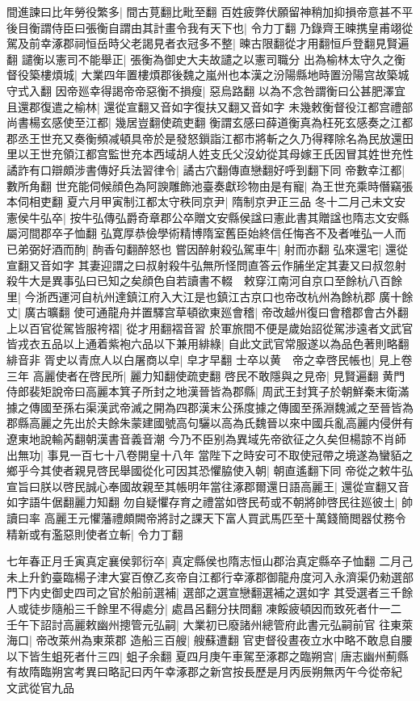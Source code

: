 間進諫曰比年勞役繁多|{
	間古莧翻比毗至翻}
百姓疲弊伏願留神稍加抑損帝意甚不平後目衡謂侍臣曰張衡自謂由其計畫令我有天下也|{
	令力丁翻}
乃錄齊王暕携皇甫翊從駕及前幸涿郡祠恒岳時父老謁見者衣冠多不整|{
	暕古限翻從才用翻恒戶登翻見賢遍翻}
譴衡以憲司不能舉正|{
	張衡為御史大夫故譴之以憲司職分}
出為榆林太守久之衡督役築樓煩城|{
	大業四年置樓煩郡後魏之嵐州也本漢之汾陽縣地時置汾陽宫故築城守式入翻}
因帝廵幸得謁帝帝惡衡不損瘦|{
	惡烏路翻}
以為不念咎謂衡曰公甚肥澤宜且還郡復遣之榆林|{
	還從宣翻又音如字復扶又翻又音如字}
未幾敕衡督役江都宫禮部尚書楊玄感使至江都|{
	幾居豈翻使疏吏翻}
衡謂玄感曰薛道衡真為枉死玄感奏之江都郡丞王世充又奏衡頻减頓具帝於是發怒鎻詣江都市將斬之久乃得釋除名為民放還田里以王世充領江都宫監世充本西域胡人姓支氏父沒幼從其母嫁王氏因冒其姓世充性譎詐有口辯頗涉書傳好兵法習律令|{
	譎古穴翻傳直戀翻好呼到翻下同}
帝數幸江都|{
	數所角翻}
世充能伺候顔色為阿諛雕飾池臺奏獻珍物由是有寵|{
	為王世充乘時僭竊張本伺相吏翻}
夏六月甲寅制江都太守秩同京尹|{
	隋制京尹正三品}
冬十二月己未文安憲侯牛弘卒|{
	按牛弘傳弘爵奇章郡公卒贈文安縣侯諡曰憲此書其贈諡也隋志文安縣屬河間郡卒子恤翻}
弘寛厚恭儉學術精博隋室舊臣始終信任悔吝不及者唯弘一人而已弟弼好酒而䣱|{
	䣱香句翻醉怒也}
嘗因醉射殺弘駕車牛|{
	射而亦翻}
弘來還宅|{
	還從宣翻又音如字}
其妻迎謂之曰叔射殺牛弘無所怪問直答云作脯坐定其妻又曰叔忽射殺牛大是異事弘曰已知之矣顔色自若讀書不輟　敕穿江南河自京口至餘杭八百餘里|{
	今浙西運河自杭州達鎮江府入大江是也鎮江古京口也帝改杭州為餘杭郡}
廣十餘丈|{
	廣古曠翻}
使可通龍舟并置驛宫草頓欲東廵會稽|{
	帝改越州復曰會稽郡會古外翻}
上以百官從駕皆服袴褶|{
	從才用翻褶音習}
於軍旅間不便是歲始詔從駕涉遠者文武官皆戎衣五品以上通着紫袍六品以下兼用緋綠|{
	自此文武官常服遂以為品色著則略翻緋音非}
胥史以青庶人以白屠商以皁|{
	皁才早翻}
士卒以黄　帝之幸啓民帳也|{
	見上卷三年}
高麗使者在啓民所|{
	麗力知翻使疏吏翻}
啓民不敢隱與之見帝|{
	見賢遍翻}
黄門侍郎裴矩說帝曰高麗本箕子所封之地漢晉皆為郡縣|{
	周武王封箕子於朝鮮秦末衛滿據之傳國至孫右渠漢武帝滅之開為四郡漢末公孫度據之傳國至孫淵魏滅之至晉皆為郡縣高麗之先出於夫餘朱蒙建國號高句驪以高為氏魏晉以來中國兵亂高麗内侵併有遼東地說輸芮翻朝漢書音義音潮}
今乃不臣别為異域先帝欲征之久矣但楊諒不肖師出無功|{
	事見一百七十八卷開皇十八年}
當陛下之時安可不取使冠帶之境遂為蠻貊之鄉乎今其使者親見啓民舉國從化可因其恐懼脇使入朝|{
	朝直遙翻下同}
帝從之敕牛弘宣旨曰朕以啓民誠心奉國故親至其帳明年當往涿郡爾還日語高麗王|{
	還從宣翻又音如字語牛倨翻麗力知翻}
勿自疑懼存育之禮當如啓民苟或不朝將帥啓民往廵彼土|{
	帥讀曰率}
高麗王元懼藩禮頗闕帝將討之課天下富人買武馬匹至十萬錢簡閲器仗務令精新或有濫惡則使者立斬|{
	令力丁翻}


七年春正月壬寅真定襄侯郭衍卒|{
	真定縣侯也隋志恒山郡治真定縣卒子恤翻}
二月己未上升釣臺臨楊子津大宴百僚乙亥帝自江都行幸涿郡御龍舟度河入永濟渠仍勑選部門下内史御史四司之官於船前選補|{
	選部之選宣戀翻選補之選如字}
其受選者三千餘人或徒步隨船三千餘里不得處分|{
	處昌呂翻分扶問翻}
凍餒疲頓因而致死者什一二　壬午下詔討高麗敕幽州摠管元弘嗣|{
	大業初已廢諸州總管府此書元弘嗣前官}
往東萊海口|{
	帝改萊州為東萊郡}
造船三百艘|{
	艘蘇遭翻}
官吏督役晝夜立水中略不敢息自腰以下皆生蛆死者什三四|{
	蛆子余翻}
夏四月庚午車駕至涿郡之臨朔宫|{
	唐志幽州薊縣有故隋臨朔宮考異曰略記曰丙午幸涿郡之新宫按長歷是月丙辰朔無丙午今從帝紀}
文武從官九品

